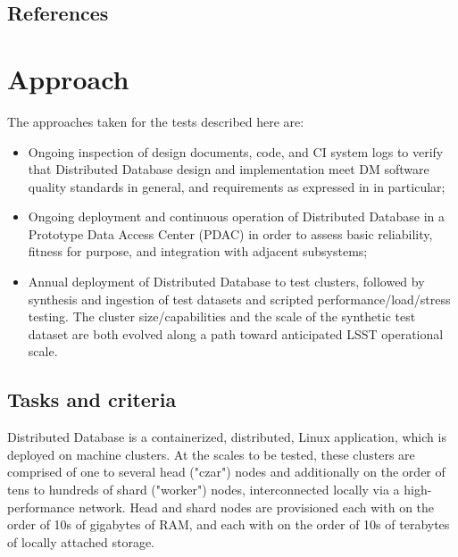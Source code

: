 \documentclass[DM,lsstdraft,STS,toc]{lsstdoc}
\def\product{Distributed Database}
\begin{document}
\subsection{References}
\label{sec:references
}
\renewcommand{\refname}{}


\newpage
\section{Approach}
\label{sec:approach}

The approaches taken for the tests described here are:

\begin{itemize}

  \item{Ongoing inspection of design documents, code, and \gls{CI} system logs to verify that \product{} design
  and implementation meet \gls{DM} software quality standards in general, and requirements as expressed in
   in particular;}

  \item{Ongoing deployment and continuous operation of \product{} in a Prototype \gls{Data Access Center}
  (\gls{PDAC}) in order to assess basic reliability, fitness for purpose, and integration with adjacent
  subsystems;}

  \item{Annual deployment of \product{} to test clusters, followed by synthesis and ingestion
  of test datasets and scripted performance/load/stress testing. The cluster size/capabilities and the
  scale of the synthetic test dataset are both evolved along a path toward anticipated \gls{LSST} operational
  scale.}

\end{itemize}

\subsection{Tasks and criteria}
\label{sec:tasks}

\product{} is a containerized, distributed, Linux application, which is deployed on machine clusters.
At the scales to be tested, these clusters are comprised of one to several head ("czar") nodes and
additionally on the order of tens to hundreds of shard ("worker") nodes, interconnected locally via a
high-performance network. Head and shard nodes are provisioned each with on the order of 10s of gigabytes of
RAM, and each with on the order of 10s of terabytes of locally attached storage.
\end{document}
